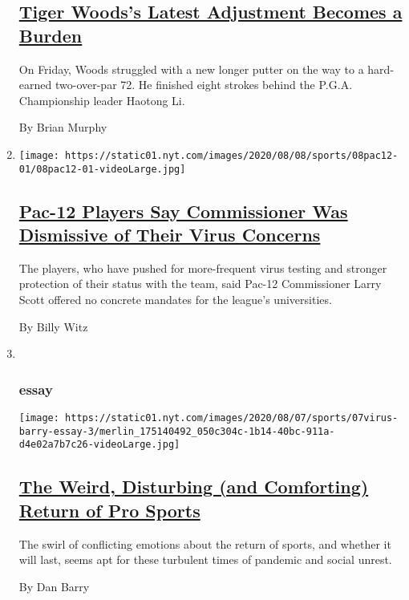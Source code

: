 \begin{enumerate}
  \hypertarget{tiger-woodss-latest-adjustment-becomes-a-burden}{%
  \subsection{\texorpdfstring{\href{/2020/08/08/sports/golf/tiger-woods-pga-championship-friday.html}{Tiger
  Woods's Latest Adjustment Becomes a
  Burden}}{Tiger Woods's Latest Adjustment Becomes a Burden}}\label{tiger-woodss-latest-adjustment-becomes-a-burden}}

  On Friday, Woods struggled with a new longer putter on the way to a
  hard-earned two-over-par 72. He finished eight strokes behind the
  P.G.A. Championship leader Haotong Li.

  By Brian Murphy
\item
  \texttt{[image: https://static01.nyt.com/images/2020/08/08/sports/08pac12-01/08pac12-01-videoLarge.jpg]}

  \hypertarget{pac-12-players-say-commissioner-was-dismissive-of-their-virus-concerns}{%
  \subsection{\texorpdfstring{\href{/2020/08/08/sports/ncaafootball/coronavirus-pac-12-players-larry-scott.html}{Pac-12
  Players Say Commissioner Was Dismissive of Their Virus
  Concerns}}{Pac-12 Players Say Commissioner Was Dismissive of Their Virus Concerns}}\label{pac-12-players-say-commissioner-was-dismissive-of-their-virus-concerns}}

  The players, who have pushed for more-frequent virus testing and
  stronger protection of their status with the team, said Pac-12
  Commissioner Larry Scott offered no concrete mandates for the league's
  universities.

  By Billy Witz
\item ~
  \hypertarget{essay}{%
  \subsubsection{essay}\label{essay}}

  \texttt{[image: https://static01.nyt.com/images/2020/08/07/sports/07virus-barry-essay-3/merlin\_175140492\_050c304c-1b14-40bc-911a-d4e02a7b7c26-videoLarge.jpg]}

  \hypertarget{the-weird-disturbing-and-comforting-return-of-pro-sports}{%
  \subsection{\texorpdfstring{\href{/2020/08/07/sports/coronavirus-restart-nba-baseball.html}{The
  Weird, Disturbing (and Comforting) Return of Pro
  Sports}}{The Weird, Disturbing (and Comforting) Return of Pro Sports}}\label{the-weird-disturbing-and-comforting-return-of-pro-sports}}

  The swirl of conflicting emotions about the return of sports, and
  whether it will last, seems apt for these turbulent times of pandemic
  and social unrest.

  By Dan Barry
\end{enumerate}


